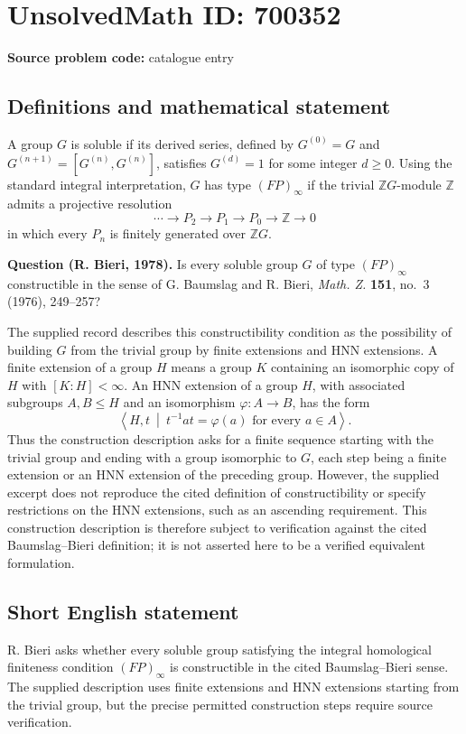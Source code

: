 \documentclass[11pt]{article}
\newcommand{\Z}{\mathbb{Z}}
\begin{document}
\section*{UnsolvedMath ID: 700352}
\textbf{Source problem code:} catalogue entry
\subsection{Definitions and mathematical statement}
A group \(G\) is soluble if its derived series, defined by \(G^{(0)}=G\) and \(G^{(n+1)}=[G^{(n)},G^{(n)}]\), satisfies \(G^{(d)}=1\) for some integer \(d\geq 0\). Using the standard integral interpretation, \(G\) has type \((FP)_\infty\) if the trivial \(\Z G\)-module \(\Z\) admits a projective resolution
\[
\cdots\longrightarrow P_2\longrightarrow P_1\longrightarrow P_0\longrightarrow\Z\longrightarrow 0
\]
in which every \(P_n\) is finitely generated over \(\Z G\).

\textbf{Question (R. Bieri, 1978).} Is every soluble group \(G\) of type \((FP)_\infty\) constructible in the sense of G. Baumslag and R. Bieri, \emph{Math. Z.} \textbf{151}, no.~3 (1976), 249--257?

The supplied record describes this constructibility condition as the possibility of building \(G\) from the trivial group by finite extensions and HNN extensions. A finite extension of a group \(H\) means a group \(K\) containing an isomorphic copy of \(H\) with \([K:H]<\infty\). An HNN extension of a group \(H\), with associated subgroups \(A,B\leq H\) and an isomorphism \(\varphi:A\to B\), has the form
\[
\left\langle H,t\ \middle|\ t^{-1}at=\varphi(a)\text{ for every }a\in A\right\rangle.
\]
Thus the construction description asks for a finite sequence starting with the trivial group and ending with a group isomorphic to \(G\), each step being a finite extension or an HNN extension of the preceding group. However, the supplied excerpt does not reproduce the cited definition of constructibility or specify restrictions on the HNN extensions, such as an ascending requirement. This construction description is therefore subject to verification against the cited Baumslag--Bieri definition; it is not asserted here to be a verified equivalent formulation.
\subsection{Short English statement}
R. Bieri asks whether every soluble group satisfying the integral homological finiteness condition \((FP)_\infty\) is constructible in the cited Baumslag--Bieri sense. The supplied description uses finite extensions and HNN extensions starting from the trivial group, but the precise permitted construction steps require source verification.
\end{document}
